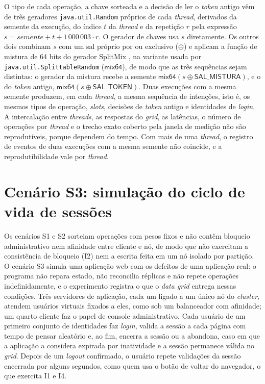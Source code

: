 O tipo de cada operação, a chave sorteada e a decisão de ler o \emph{token} antigo vêm de três geradores \texttt{java.util.Random} próprios de cada \emph{thread}, derivados da semente da execução, do índice $t$ da \emph{thread} e da repetição $r$ pela expressão $s = \textit{semente} + t + 1\,000\,003 \cdot r$. O gerador de chaves usa $s$ diretamente. Os outros dois combinam $s$ com um sal próprio por ou exclusivo ($\oplus$) e aplicam a função de mistura de 64 bits do gerador SplitMix \citep{steele_lea_flood_splitmix_2014}, na variante usada por \texttt{java.util.SplittableRandom} ($\textsf{mix64}$), de modo que as três sequências sejam distintas: o gerador da mistura recebe a semente $\textsf{mix64}(s \oplus \textsf{SAL\_MISTURA})$, e o do \emph{token} antigo, $\textsf{mix64}(s \oplus \textsf{SAL\_TOKEN})$. Duas execuções com a mesma semente produzem, em cada \emph{thread}, a mesma sequência de intenções, isto é, os mesmos tipos de operação, \emph{slots}, decisões de \emph{token} antigo e identidades de \emph{login}. A intercalação entre \emph{threads}, as respostas do \emph{grid}, as latências, o número de operações por \emph{thread} e o trecho exato coberto pela janela de medição não são reprodutíveis, porque dependem do tempo. Com mais de uma \emph{thread}, o registro de eventos de duas execuções com a mesma semente não coincide, e a reprodutibilidade vale por \emph{thread}.

\section*{Cenário S3: simulação do ciclo de vida de sessões}
\label{sec-carga-s3}

Os cenários S1 e S2 sorteiam operações com pesos fixos e não contêm bloqueio administrativo nem afinidade entre cliente e nó, de modo que não exercitam a consistência de bloqueio (I2) nem a escrita feita em um nó isolado por partição. O cenário S3 simula uma aplicação web com os defeitos de uma aplicação real: o programa não repara estado, não reconcilia réplicas e não repete operações indefinidamente, e o experimento registra o que o \emph{data grid} entrega nessas condições. Três servidores de aplicação, cada um ligado a um único nó do \emph{cluster}, atendem usuários virtuais fixados a eles, como sob um balanceador com afinidade; um quarto cliente faz o papel de console administrativo. Cada usuário de um primeiro conjunto de identidades faz \emph{login}, valida a sessão a cada página com tempo de pensar aleatório e, ao fim, encerra a sessão ou a abandona, caso em que a aplicação a considera expirada por inatividade e a sessão permanece válida no \emph{grid}. Depois de um \emph{logout} confirmado, o usuário repete validações da sessão encerrada por alguns segundos, como quem usa o botão de voltar do navegador, o que exercita I1 e I4.

